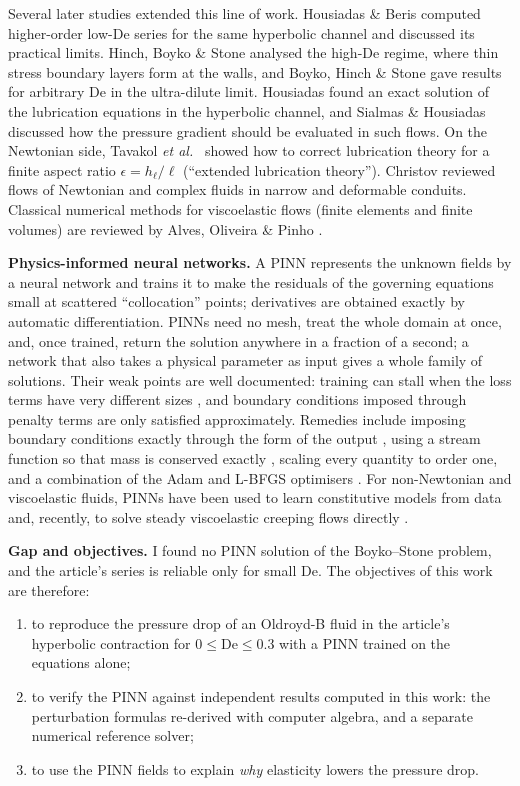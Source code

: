 \documentclass[11pt,a4paper]{article}
\newcommand{\De}{\mathrm{De}}
\begin{document}
Several later studies extended this line of work. Housiadas \& Beris \cite{housiadas2023,housiadas2024} computed higher-order low-$\De$ series for the same hyperbolic channel and discussed its practical limits. Hinch, Boyko \& Stone \cite{hinch2024} analysed the high-$\De$ regime, where thin stress boundary layers form at the walls, and Boyko, Hinch \& Stone \cite{boyko2024} gave results for arbitrary $\De$ in the ultra-dilute limit. Housiadas \cite{housiadas2025} found an exact solution of the lubrication equations in the hyperbolic channel, and Sialmas \& Housiadas \cite{sialmas2025} discussed how the pressure gradient should be evaluated in such flows. On the Newtonian side, Tavakol \emph{et al.}\ \cite{tavakol2017} showed how to correct lubrication theory for a finite aspect ratio $\epsilon=h_\ell/\ell$ (``extended lubrication theory''). Christov \cite{christov2022} reviewed flows of Newtonian and complex fluids in narrow and deformable conduits. Classical numerical methods for viscoelastic flows (finite elements and finite volumes) are reviewed by Alves, Oliveira \& Pinho \cite{alves2021}.

\textbf{Physics-informed neural networks.} A PINN \cite{raissi2019,karniadakis2021} represents the unknown fields by a neural network and trains it to make the residuals of the governing equations small at scattered ``collocation'' points; derivatives are obtained exactly by automatic differentiation. PINNs need no mesh, treat the whole domain at once, and, once trained, return the solution anywhere in a fraction of a second; a network that also takes a physical parameter as input gives a whole family of solutions. Their weak points are well documented: training can stall when the loss terms have very different sizes \cite{wang2021grad,krishnapriyan2021}, and boundary conditions imposed through penalty terms are only satisfied approximately. Remedies include imposing boundary conditions exactly through the form of the output \cite{sukumar2022}, using a stream function so that mass is conserved exactly \cite{rao2020}, scaling every quantity to order one, and a combination of the Adam and L-BFGS optimisers \cite{wang2023guide}. For non-Newtonian and viscoelastic fluids, PINNs have been used to learn constitutive models from data \cite{mahmoudabadbozchelou2022,thakur2024} and, recently, to solve steady viscoelastic creeping flows directly \cite{matos2026}.

\textbf{Gap and objectives.} I found no PINN solution of the Boyko--Stone problem, and the article's series is reliable only for small $\De$. The objectives of this work are therefore:
\begin{enumerate}[label=(\roman*)]
\item to reproduce the pressure drop of an Oldroyd-B fluid in the article's hyperbolic contraction for $0\le\De\le0.3$ with a PINN trained on the equations alone;
\item to verify the PINN against independent results computed in this work: the perturbation formulas re-derived with computer algebra, and a separate numerical reference solver;
\item to use the PINN fields to explain \emph{why} elasticity lowers the pressure drop.
\end{enumerate}
\end{document}
